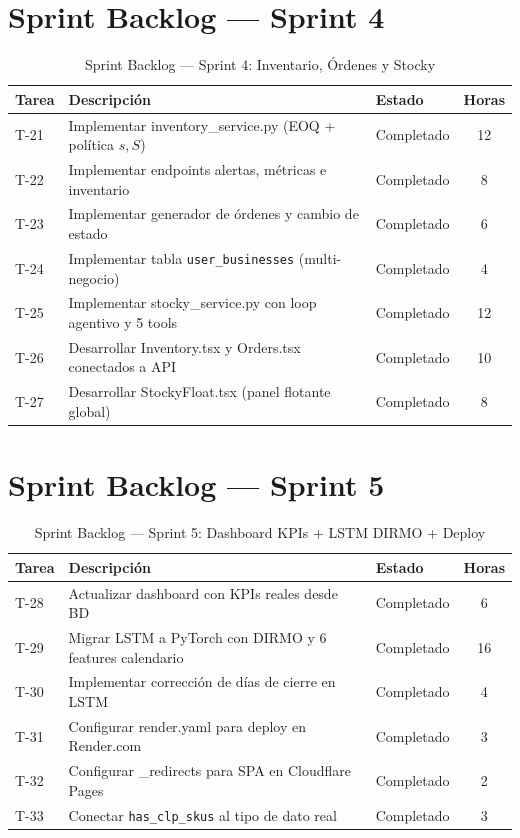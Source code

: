\documentclass[12pt, a4paper]{report}
\begin{document}
\section{Sprint Backlog — Sprint 4}

\begin{table}[H]
  \centering
  \caption{Sprint Backlog — Sprint 4: Inventario, Órdenes y Stocky}
  \label{tab:sprint4}
  \begin{tabular}{|l|p{6cm}|l|c|}
    \hline
    \textbf{Tarea} & \textbf{Descripción} & \textbf{Estado} & \textbf{Horas} \\
    \hline
    T-21 & Implementar inventory\_service.py (EOQ + política $s,S$)    & Completado & 12 \\
    T-22 & Implementar endpoints alertas, métricas e inventario         & Completado & 8 \\
    T-23 & Implementar generador de órdenes y cambio de estado          & Completado & 6 \\
    T-24 & Implementar tabla \texttt{user\_businesses} (multi-negocio)  & Completado & 4 \\
    T-25 & Implementar stocky\_service.py con loop agentivo y 5 tools   & Completado & 12 \\
    T-26 & Desarrollar Inventory.tsx y Orders.tsx conectados a API      & Completado & 10 \\
    T-27 & Desarrollar StockyFloat.tsx (panel flotante global)          & Completado & 8 \\
    \hline
  \end{tabular}
\end{table}

\section{Sprint Backlog — Sprint 5}

\begin{table}[H]
  \centering
  \caption{Sprint Backlog — Sprint 5: Dashboard KPIs + LSTM DIRMO + Deploy}
  \label{tab:sprint5}
  \begin{tabular}{|l|p{6cm}|l|c|}
    \hline
    \textbf{Tarea} & \textbf{Descripción} & \textbf{Estado} & \textbf{Horas} \\
    \hline
    T-28 & Actualizar dashboard con KPIs reales desde BD               & Completado & 6 \\
    T-29 & Migrar LSTM a PyTorch con DIRMO y 6 features calendario      & Completado & 16 \\
    T-30 & Implementar corrección de días de cierre en LSTM             & Completado & 4 \\
    T-31 & Configurar render.yaml para deploy en Render.com             & Completado & 3 \\
    T-32 & Configurar \_redirects para SPA en Cloudflare Pages          & Completado & 2 \\
    T-33 & Conectar \texttt{has\_clp\_skus} al tipo de dato real        & Completado & 3 \\
    \hline
  \end{tabular}
\end{table}
\end{document}
